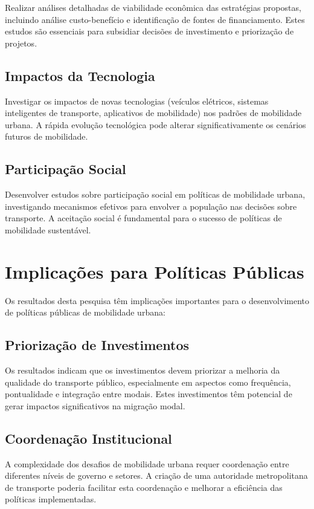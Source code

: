 Realizar análises detalhadas de viabilidade econômica das estratégias propostas, incluindo análise custo-benefício e identificação de fontes de financiamento. Estes estudos são essenciais para subsidiar decisões de investimento e priorização de projetos.

\subsection{Impactos da Tecnologia}

Investigar os impactos de novas tecnologias (veículos elétricos, sistemas inteligentes de transporte, aplicativos de mobilidade) nos padrões de mobilidade urbana. A rápida evolução tecnológica pode alterar significativamente os cenários futuros de mobilidade.

\subsection{Participação Social}

Desenvolver estudos sobre participação social em políticas de mobilidade urbana, investigando mecanismos efetivos para envolver a população nas decisões sobre transporte. A aceitação social é fundamental para o sucesso de políticas de mobilidade sustentável.

\section{Implicações para Políticas Públicas}

Os resultados desta pesquisa têm implicações importantes para o desenvolvimento de políticas públicas de mobilidade urbana:

\subsection{Priorização de Investimentos}

Os resultados indicam que os investimentos devem priorizar a melhoria da qualidade do transporte público, especialmente em aspectos como frequência, pontualidade e integração entre modais. Estes investimentos têm potencial de gerar impactos significativos na migração modal.

\subsection{Coordenação Institucional}

A complexidade dos desafios de mobilidade urbana requer coordenação entre diferentes níveis de governo e setores. A criação de uma autoridade metropolitana de transporte poderia facilitar esta coordenação e melhorar a eficiência das políticas implementadas.

